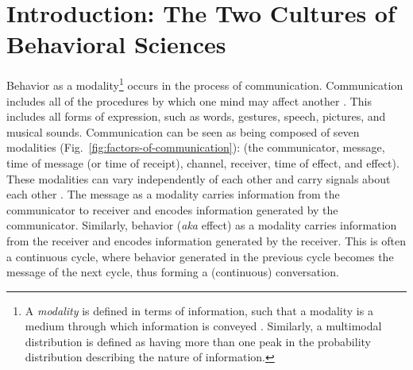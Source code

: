
\chapter{Introduction: The Two Cultures of Behavioral Sciences}
\setcounter{page}{1}

Behavior as a modality\footnote{A \textit{modality} is defined in terms of information, such that a modality is a medium through which information is conveyed \cite{liang2022foundations,grifoni2009multimodal,martin2001annotation}. Similarly, a multimodal distribution is defined as having more than one peak in the probability distribution describing the nature of information.} occurs in the process of communication. Communication includes all of the procedures by which one mind may affect another \cite{shannon-weaver-1949}. This includes all forms of expression, such as words, gestures, speech, pictures, and musical sounds. Communication can be seen as being composed of seven modalities (Fig.~\ref{fig:factors-of-communication}): (the communicator, message, time of message (or time of receipt), channel, receiver, time of effect, and effect). These modalities can vary independently of each other \cite{khandelwal2023large,khurana-etal-2023-synthesizing,si2023long,khurana2023behavior} and carry signals about each other \cite{khurana-etal-2023-synthesizing,bhattacharya2023video}. The message as a modality carries information from the communicator to receiver and encodes information generated by the communicator. Similarly, behavior (\textit{aka} effect) as a modality carries information from the receiver and encodes information generated by the receiver. This is often a continuous cycle, where behavior generated in the previous cycle becomes the message of the next cycle, thus forming a (continuous) conversation. 



